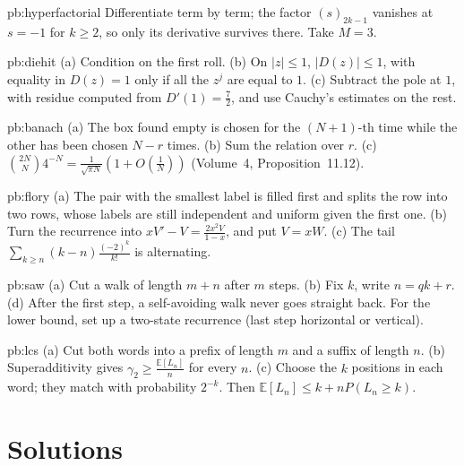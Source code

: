 \begin{hint}{pb:hyperfactorial}
Differentiate term by term; the factor $(s)_{2k-1}$ vanishes at $s=-1$ for $k\ge2$, so only its derivative survives there. Take $M=3$.
\end{hint}

\begin{hint}{pb:diehit}
(a) Condition on the first roll. (b) On $|z|\le1$, $|D(z)|\le1$, with equality in $D(z)=1$ only if all the $z^j$ are equal to $1$. (c) Subtract the pole at $1$, with residue computed from $D'(1)=\frac72$,
and use Cauchy's estimates on the rest.
\end{hint}

\begin{hint}{pb:banach}
(a) The box found empty is chosen for the $(N+1)$-th time while the other has been chosen $N-r$ times. (b) Sum the relation over $r$. (c) $\binom{2N}N4^{-N}=\frac1{\sqrt{\pi N}}(1+O(\frac1N))$
(Volume~4, Proposition~11.12).
\end{hint}

\begin{hint}{pb:flory}
(a) The pair with the smallest label is filled first and splits the row into two rows, whose labels are still independent and uniform given the first one. (b) Turn the
recurrence into $xV'-V=\frac{2x^2V}{1-x}$, and put $V=xW$. (c) The tail $\sum_{k\ge n}(k-n)\frac{(-2)^k}{k!}$ is alternating.
\end{hint}

\begin{hint}{pb:saw}
(a) Cut a walk of length $m+n$ after $m$ steps. (b) Fix $k$, write $n=qk+r$. (d) After the first step, a self-avoiding walk never goes straight back. For the lower bound, set up a
two-state recurrence (last step horizontal or vertical).
\end{hint}

\begin{hint}{pb:lcs}
(a) Cut both words into a prefix of length $m$ and a suffix of length $n$. (b) Superadditivity gives $\gamma_2\ge\frac{\mathbb E[L_n]}n$ for every $n$. (c) Choose the $k$ positions in each word;
they match with probability $2^{-k}$. Then $\mathbb E[L_n]\le k+nP(L_n\ge k)$.
\end{hint}

\section{Solutions}

